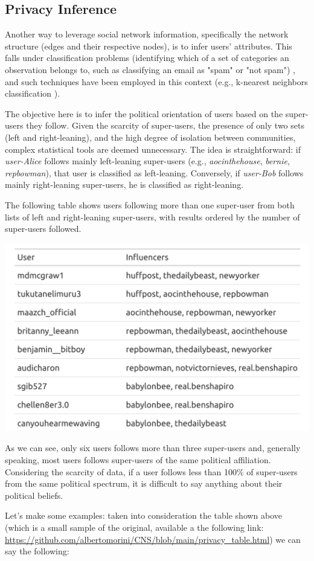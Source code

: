 \subsection{Privacy Inference}
Another way to leverage social network information, specifically the network structure (edges and their respective nodes), is to infer users' attributes. This falls under classification problems (identifying which of a set of categories an observation belongs to, such as classifying an email as "spam" or "not spam") \cite{wikiClassification}, and such techniques have been employed in this context (e.g., k-nearest neighbors classification \cite{wikiKNN}).

The objective here is to infer the political orientation of users based on the super-users they follow. Given the scarcity of super-users, the presence of only two sets (left and right-leaning), and the high degree of isolation between communities, complex statistical tools are deemed unnecessary. The idea is straightforward: if \textit{user-Alice} follows mainly left-leaning super-users (e.g., \textit{aocinthehouse}, \textit{bernie}, \textit{repbowman}), that user is classified as left-leaning. Conversely, if \textit{user-Bob} follows mainly right-leaning super-users, he is classified as right-leaning.

The following table shows users following more than one super-user from both lists of left and right-leaning super-users, with results ordered by the number of super-users followed.

\aCapo{}
\includegraphics[width = .5\textwidth]{images/final_privacy_table.png}

As we can see, only six users follows more than three super-users and, generally speaking, most users follows super-users of the same political affiliation. Considering the scarcity of data, if a user follows less than 100\% of super-users from the same political spectrum, it is difficult to say anything about their political beliefs.

Let's make some examples: taken into consideration the table shown above (which is a small sample of the original, available a the following link: \url{https://github.com/albertomorini/CNS/blob/main/privacy\_table.html}) we can say the following:

